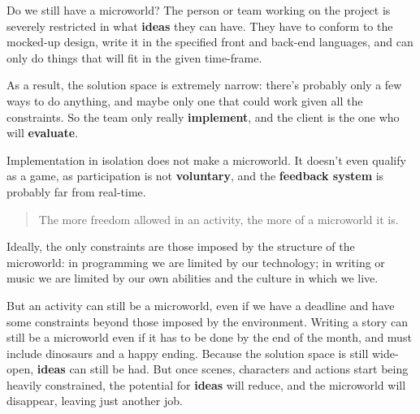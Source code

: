 Do we still have a microworld? The person or team working on the project
is severely restricted in what \textbf{ideas} they can have. They have
to conform to the mocked-up design, write it in the specified front and
back-end languages, and can only do things that will fit in the given
time-frame.

As a result, the solution space is extremely narrow: there's probably
only a few ways to do anything, and maybe only one that could work given
all the constraints. So the team only really \textbf{implement}, and the
client is the one who will \textbf{evaluate}.

Implementation in isolation does not make a microworld. It doesn't even qualify as
a game, as participation is not \textbf{voluntary}, and the
\textbf{feedback system} is probably far from real-time.

\begin{quote}
The more freedom allowed in an activity, the more of a microworld it is.
\end{quote}

Ideally, the only constraints are those imposed by the structure of the
microworld: in programming we are limited by our technology; in writing
or music we are limited by our own abilities and the culture in which we
live.

But an activity can still be a microworld, even if we have a deadline
and have some constraints beyond those imposed by the environment. Writing
a story can still be a microworld even if it has to be done by the end
of the month, and must include dinosaurs and a happy ending. Because the solution space is still wide-open, \textbf{ideas} can still
be had. But once scenes, characters and actions start being heavily
constrained, the potential for \textbf{ideas} will reduce, and the
microworld will disappear, leaving just another job.
